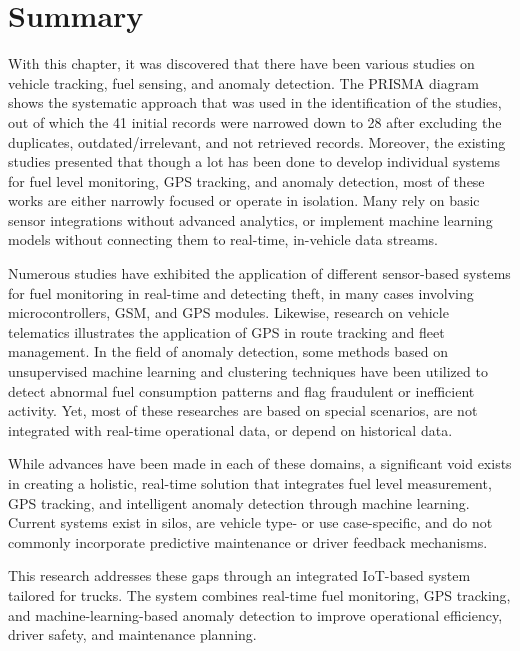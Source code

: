 \clearpage  %

\section{Summary}
With this chapter, it was discovered that there have been various studies on vehicle tracking, fuel sensing, and anomaly detection. The PRISMA diagram shows the systematic approach that was used in the identification of the studies, out of which the 41 initial records were narrowed down to 28 after excluding the duplicates, outdated/irrelevant, and not retrieved records. Moreover, the existing studies presented that though a lot has been done to develop individual systems for fuel level monitoring, GPS tracking, and anomaly detection, most of these works are either narrowly focused or operate in isolation. Many rely on basic sensor integrations without advanced analytics, or implement machine learning models without connecting them to real-time, in-vehicle data streams.

Numerous studies have exhibited the application of different sensor-based systems for fuel monitoring in real-time and detecting theft, in many cases involving microcontrollers, GSM, and GPS modules. Likewise, research on vehicle telematics illustrates the application of GPS in route tracking and fleet management. In the field of anomaly detection, some methods based on unsupervised machine learning and clustering techniques have been utilized to detect abnormal fuel consumption patterns and flag fraudulent or inefficient activity. Yet, most of these researches are based on special scenarios, are not integrated with real-time operational data, or depend on historical data.

While advances have been made in each of these domains, a significant void exists in creating a holistic, real-time solution that integrates fuel level measurement, GPS tracking, and intelligent anomaly detection through machine learning. Current systems exist in silos, are vehicle type- or use case-specific, and do not commonly incorporate predictive maintenance or driver feedback mechanisms.

This research addresses these gaps through an integrated IoT-based system tailored for trucks. The system combines real-time fuel monitoring, GPS tracking, and machine-learning-based anomaly detection to improve operational efficiency, driver safety, and maintenance planning.
